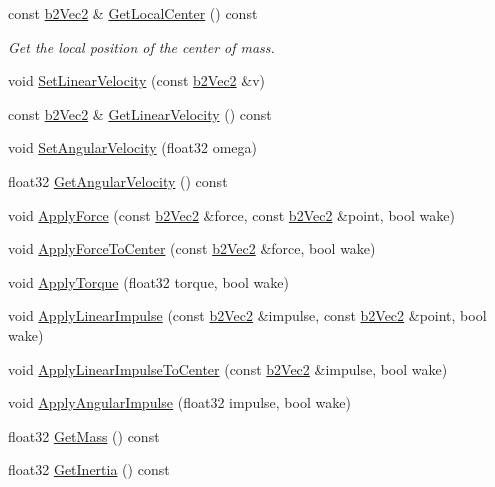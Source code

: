 \begin{DoxyCompactItemize}
\mbox{\label{classb2_body_a60cc46fc46849b0d5e61a151b7c41269}} 
const \hyperlink{structb2_vec2}{b2\+Vec2} \& \hyperlink{classb2_body_a60cc46fc46849b0d5e61a151b7c41269}{Get\+Local\+Center} () const
\begin{DoxyCompactList}\small\item\em Get the local position of the center of mass. \end{DoxyCompactList}\item 
void \hyperlink{classb2_body_a832f3989a44f0d4782c80456832197ad}{Set\+Linear\+Velocity} (const \hyperlink{structb2_vec2}{b2\+Vec2} \&v)
\item 
const \hyperlink{structb2_vec2}{b2\+Vec2} \& \hyperlink{classb2_body_a8fcaf842141320701057f679dff90b89}{Get\+Linear\+Velocity} () const
\item 
void \hyperlink{classb2_body_a37adc4160b84f73e8552a91cbde3f578}{Set\+Angular\+Velocity} (float32 omega)
\item 
float32 \hyperlink{classb2_body_a6a404d85efc510f43575f61cb95c07a7}{Get\+Angular\+Velocity} () const
\item 
void \hyperlink{classb2_body_a942be8e1cd2bcd06f53c4638c45a9525}{Apply\+Force} (const \hyperlink{structb2_vec2}{b2\+Vec2} \&force, const \hyperlink{structb2_vec2}{b2\+Vec2} \&point, bool wake)
\item 
void \hyperlink{classb2_body_abeba04911f7a2a141169bb06fe98d06a}{Apply\+Force\+To\+Center} (const \hyperlink{structb2_vec2}{b2\+Vec2} \&force, bool wake)
\item 
void \hyperlink{classb2_body_a54a354447ac3b4cc224c8327a5abc0e8}{Apply\+Torque} (float32 torque, bool wake)
\item 
void \hyperlink{classb2_body_a7f677e93efb3c4c065087aff317274a3}{Apply\+Linear\+Impulse} (const \hyperlink{structb2_vec2}{b2\+Vec2} \&impulse, const \hyperlink{structb2_vec2}{b2\+Vec2} \&point, bool wake)
\item 
void \hyperlink{classb2_body_afa249d2fc11735985211e47c3d8e16fb}{Apply\+Linear\+Impulse\+To\+Center} (const \hyperlink{structb2_vec2}{b2\+Vec2} \&impulse, bool wake)
\item 
void \hyperlink{classb2_body_a65384cfad8db2376cdf3fab38cac06e5}{Apply\+Angular\+Impulse} (float32 impulse, bool wake)
\item 
float32 \hyperlink{classb2_body_adfeebf45965d131894f728a2f264311d}{Get\+Mass} () const
\item 
float32 \hyperlink{classb2_body_a60929c13e4b6548492dca5ec79f159db}{Get\+Inertia} () const

\end{DoxyCompactItemize}
